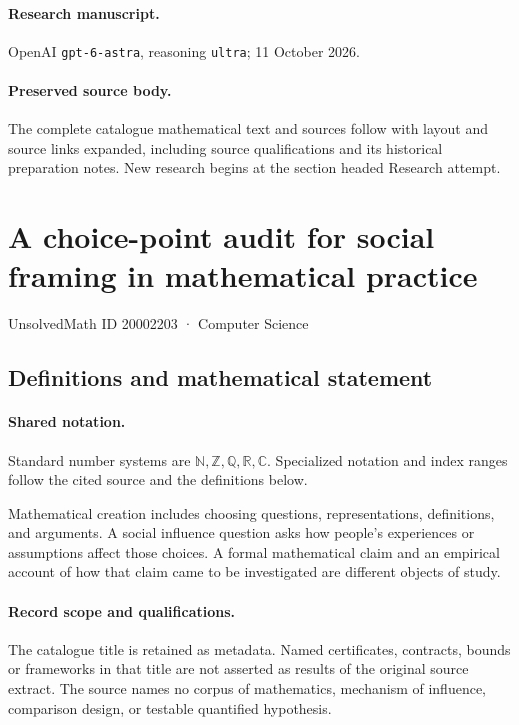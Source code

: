\documentclass[11pt]{article}
\begin{document}
\paragraph{Research manuscript.} OpenAI \texttt{gpt-6-astra}, reasoning \texttt{ultra}; 11 October 2026.
\paragraph{Preserved source body.} The complete catalogue mathematical text and sources follow with layout and source links expanded, including source qualifications and its historical preparation notes. New research begins at the section headed Research attempt.

\section{A choice-point audit for social framing in mathematical practice}\label{20002203}
{\small UnsolvedMath ID 20002203 · Computer Science}
\subsection{Definitions and mathematical statement}

\paragraph{Shared notation.}Standard number systems are $\mathbb N,\mathbb Z,\mathbb Q,\mathbb R,\mathbb C$. Specialized notation and index ranges follow the cited source and the definitions below.


Mathematical creation includes choosing questions, representations, definitions, and arguments. A social influence question asks how people's experiences or assumptions affect those choices. A formal mathematical claim and an empirical account of how that claim came to be investigated are different objects of study.
\paragraph{Record scope and qualifications.}
The catalogue title is retained as metadata. Named certificates, contracts, bounds or frameworks in that title are not asserted as results of the original source extract.
The source names no corpus of mathematics, mechanism of influence, comparison design, or testable quantified hypothesis.
\end{document}
